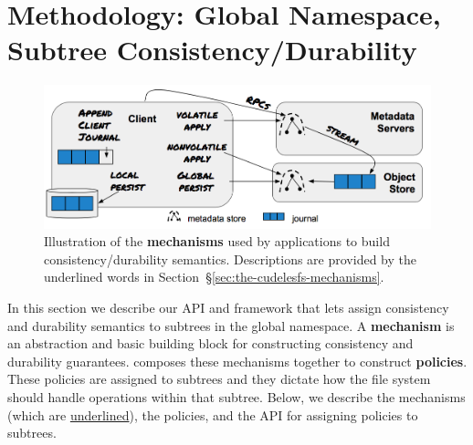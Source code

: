 \section{Methodology: Global Namespace, Subtree Consistency/Durability}
\label{sec:methodology-decoupled-namespaces}

\begin{figure}[tb]
\centering
\includegraphics[width=1.0\linewidth]{./chapters/cudele/figures/fig-decouple.png}
\caption{Illustration of the \textbf{mechanisms} used by applications to build
consistency/durability semantics. Descriptions are provided by the
underlined words in Section~\S\ref{sec:the-cudelesfs-mechanisms}.
}\label{fig:decouple}
\end{figure}


In this section we describe our API and framework that lets
 assign consistency and durability
semantics to subtrees in the global namespace. A \textbf{mechanism} is an
abstraction and basic building block for constructing consistency and
durability guarantees.  composes these mechanisms together to
construct \textbf{policies}.  These policies are assigned to subtrees and they
dictate how the file system should handle operations within that subtree.
Below, we describe the mechanisms (which are \underline{underlined}), the
policies, and the API for assigning policies to subtrees.

